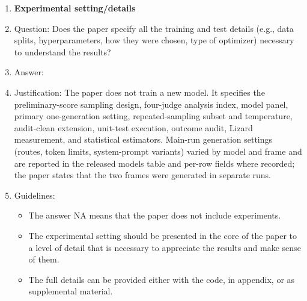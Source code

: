 \begin{enumerate}
\item {\bf Experimental setting/details}
    \item[] Question: Does the paper specify all the training and test details (e.g., data splits, hyperparameters, how they were chosen, type of optimizer) necessary to understand the results?
    \item[] Answer: \answerYes{}
    \item[] Justification: The paper does not train a new model. It specifies the preliminary-score sampling design, four-judge analysis index, model panel, primary one-generation setting, repeated-sampling subset and temperature, audit-clean extension, unit-test execution, outcome audit, Lizard measurement, and statistical estimators. Main-run generation settings (routes, token limits, system-prompt variants) varied by model and frame and are reported in the released models table and per-row fields where recorded; the paper states that the two frames were generated in separate runs.
    \item[] Guidelines:
    \begin{itemize}
        \item The answer NA means that the paper does not include experiments.
        \item The experimental setting should be presented in the core of the paper to a level of detail that is necessary to appreciate the results and make sense of them.
        \item The full details can be provided either with the code, in appendix, or as supplemental material.
    \end{itemize}


\end{enumerate}
